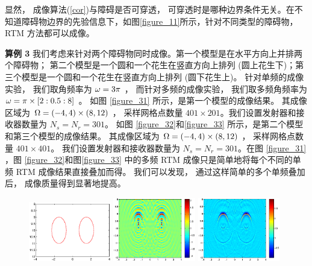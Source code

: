 {显然， 成像算法(\ref{cor})与障碍是否可穿透， 可穿透时是哪种边界条件无关。在不知道障碍物边界的先验信息下，如图\ref{figure_11}所示，针对不同类型的障碍物， RTM 方法都可以成像。

\bigskip
\textbf{算例 3} 我们考虑来针对两个障碍物同时成像。第一个模型是在水平方向上并排两个障碍物； 第二个模型是一个圆和一个花生在竖直方向上排列 (圆上花生下)；第三个模型是一个圆和一个花生在竖直方向上排列 (圆下花生上)。 针对单频的成像实验， 我们取角频率为 $\omega=3\pi$ ， 而针对多频的成像实验， 我们取多频角频率为 $\omega=\pi\times[2:0.5:8]$ 。 如图 \ref{figure_31} 所示，是第一个模型的成像结果。 其成像区域为 $\Omega=(-4, 4) \times (8,12)$ ， 采样网格点数量 $401 \times 201$。我们设置发射器和接收器数量为 $N_s = N_r = 301$。 如图 \ref{figure_32}和\ref{figure_33} 所示，是第二个模型和第三个模型的成像结果。 其成像区域为 $\Omega=(-4, 4)\times (8,12)$ ， 采样网格点数量 $401 \times 401$。 我们设置发射器和接收器数量为 $N_s = N_r = 301$。在图 \ref{figure_31} ，图 \ref{figure_32}和图\ref{figure_33} 中的多频 RTM 成像只是简单地将每个不同的单频 RTM 成像结果直接叠加而得。 我们可以发现， 通过这样简单的多个单频叠加后， 成像质量得到显著地提高。
 
\begin{figure}[htbp]
	\centering
	\includegraphics[width=0.32\textwidth,height=0.16\textheight]{./Img/graphic/bi_circle_profile.eps}
	\includegraphics[width=0.32\textwidth]{./Img/graphic/bi_circle_3pi.eps}
	\includegraphics[width=0.32\textwidth]{./Img/graphic/bi_circle.eps}
	

\end{figure}}
